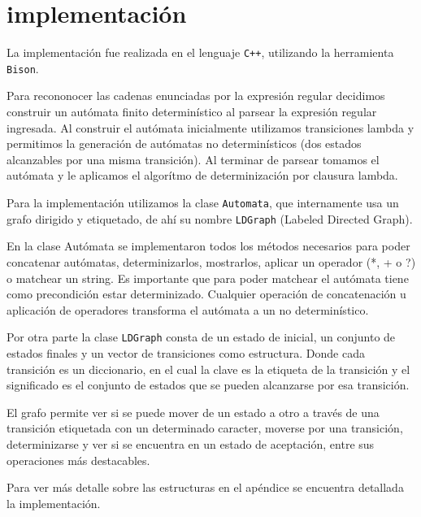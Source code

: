 \section{implementación}

La implementación fue realizada en el lenguaje \texttt{C++}, utilizando la herramienta \texttt{Bison}. 

Para recononocer las cadenas enunciadas por la expresión regular decidimos construir 
un autómata finito determinístico al parsear la expresión regular ingresada.
Al construir el autómata inicialmente utilizamos transiciones lambda y permitimos 
la generación de autómatas no determinísticos (dos estados alcanzables por una misma
transición). Al terminar de parsear tomamos el autómata y le aplicamos el algorítmo
de determinización por clausura lambda.

Para la implementación utilizamos la clase \texttt{Automata}, que internamente usa un 
grafo dirigido y etiquetado, de ahí su nombre \texttt{LDGraph} (Labeled Directed Graph).

En la clase Autómata se implementaron todos los métodos necesarios para poder 
concatenar autómatas, determinizarlos, mostrarlos, aplicar un operador (*, + o ?) 
o matchear un string. Es importante que para poder matchear el autómata tiene como
precondición estar determinizado. Cualquier operación de concatenación u 
aplicación de operadores transforma el autómata a un no determinístico.

Por otra parte la clase \texttt{LDGraph} consta de un estado de inicial, un conjunto de 
estados finales y un vector de transiciones como estructura. Donde cada transición
es un diccionario, en el cual la clave es la etiqueta de la transición y el 
significado es el conjunto de estados que se pueden alcanzarse por esa transición.

El grafo permite ver si se puede mover de un estado a otro a través de una transición
etiquetada con un determinado caracter, moverse por una transición, determinizarse
y ver si se encuentra en un estado de aceptación, entre sus operaciones más destacables.

Para ver más detalle sobre las estructuras en el apéndice se encuentra detallada 
la implementación.
